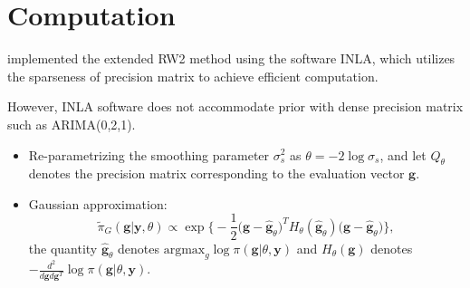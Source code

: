 \documentclass{beamer} %
\begin{document}
\section{Computation}

\begin{frame}

\cite{rw2} implemented the extended RW2 method using the software INLA, which utilizes the sparseness of precision matrix to achieve efficient computation.

\vspace{0.3in}

\pause
However, INLA software does not accommodate prior with dense precision matrix such as ARIMA(0,2,1).

\end{frame}






\begin{frame}
\begin{itemize}
\pause
\item Re-parametrizing the smoothing parameter $\sigma_s^2$ as $\theta = -2\log \sigma_s$, and let $Q_\theta$ denotes the precision matrix corresponding to the evaluation vector $\boldsymbol{g}$.
\pause
\item Gaussian approximation:
\begin{equation}\label{GaussianApproxi}
\tilde{\pi}_G(\boldsymbol{g}|\boldsymbol{y},\theta) \propto \exp \bigg\{ -\frac{1}{2} \bigg(\boldsymbol{g} - \hat{\boldsymbol{g}}_\theta \bigg)^T H_\theta (\hat{\boldsymbol{g}}_\theta) \bigg(\boldsymbol{g} - \hat{\boldsymbol{g}}_\theta \bigg) \bigg\},
\end{equation}
the quantity $\hat{\boldsymbol{g}}_\theta$ denotes $\text{argmax}_g \log \pi (\boldsymbol{g} | \theta, \boldsymbol{y})$ and $H_\theta (\boldsymbol{g})$ denotes $-\frac{d^2}{d\boldsymbol{g}d\boldsymbol{g}^T} \log \pi(\boldsymbol{g} | \theta, \boldsymbol{y})$.
\end{itemize}
\end{frame}
\end{document}
